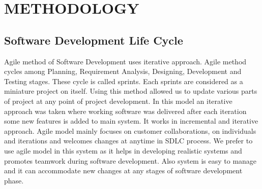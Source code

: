 

\section{METHODOLOGY}
\subsection{Software Development Life Cycle}
\justify
Agile method of Software Development uses iterative approach. Agile method cycles
among Planning, Requirement Analysis, Designing, Development and Testing stages.
These cycle is called sprints. Each sprints are considered as a miniature project on itself.
Using this method allowed us to update various parts of project at any point of project
development. In this model an iterative approach was taken where working software
was delivered after each iteration some new features is added to main system. It works
in incremental and iterative approach. Agile model mainly focuses on customer
collaborations, on individuals and iterations and welcomes changes at anytime in
SDLC process. We prefer to use agile model in this system as it helps in developing
realistic systems and promotes teamwork during software development. Also system is
easy to manage and it can accommodate new changes at any stages of software
development phase. \\
\vspace{0.2 in}
